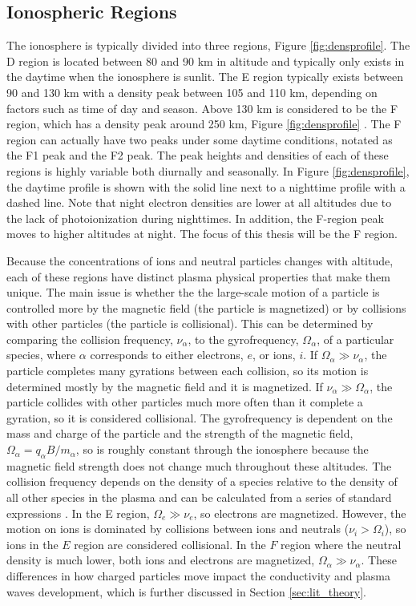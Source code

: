 \subsection{Ionospheric Regions}
\label{sec:ionosphere_regions}
The ionosphere is typically divided into three regions, Figure \ref{fig:densprofile}.  The D region is located between 80 and 90 km in altitude and typically only exists in the daytime when the ionosphere is sunlit.  The E region typically exists between 90 and 130 km with a density peak between 105 and 110 km, depending on factors such as time of day and season.  Above 130 km is considered to be the F region, which has a density peak around 250 km, Figure \ref{fig:densprofile} \citet{Luhmann1995}.  The F region can actually have two peaks under some daytime conditions, notated as the F1 peak and the F2 peak.  The peak heights and densities of each of these regions is highly variable both diurnally and seasonally.  In Figure \ref{fig:densprofile}, the daytime profile is shown with the solid line next to a nighttime profile with a dashed line.  Note that night electron densities are lower at all altitudes due to the lack of photoionization during nighttimes.  In addition, the F-region peak moves to higher altitudes at night.  The focus of this thesis will be the F region.

Because the concentrations of ions and neutral particles changes with altitude, each of these regions have distinct plasma physical properties that make them unique.  The main issue is whether the the large-scale motion of a particle is controlled more by the magnetic field (the particle is magnetized) or by collisions with other particles (the particle is collisional).  This can be determined by comparing the collision frequency, \(\nu_\alpha\), to the gyrofrequency, \(\Omega_\alpha\), of a particular species, where \(\alpha\) corresponds to either electrons, \(e\), or ions, \(i\).  If \(\Omega_\alpha \gg \nu_\alpha\), the particle completes many gyrations between each collision, so its motion is determined mostly by the magnetic field and it is magnetized.  If \(\nu_\alpha \gg \Omega_\alpha\), the particle collides with other particles much more often than it complete a gyration, so it is considered collisional.  The gyrofrequency is dependent on the mass and charge of the particle and the strength of the magnetic field, \(\Omega_\alpha = q_\alpha B/m_\alpha\), so is roughly constant through the ionosphere because the magnetic field strength does not change much throughout these altitudes.  The collision frequency depends on the density of a species relative to the density of all other species in the plasma and can be calculated from a series of standard expressions \citep{Schunk1980,Schunk2009}.  In the E region, \(\Omega_e \gg \nu_e\), so electrons are magnetized.  However, the motion on ions is dominated by collisions between ions and neutrals (\(\nu_i > \Omega_i\)), so ions in the \(E\) region are considered collisional.  In the \(F\) region where the neutral density is much lower, both ions and electrons are magnetized, \(\Omega_\alpha \gg \nu_\alpha\).  These differences in how charged particles move impact the conductivity and plasma waves development, which is further discussed in Section \ref{sec:lit_theory}.


